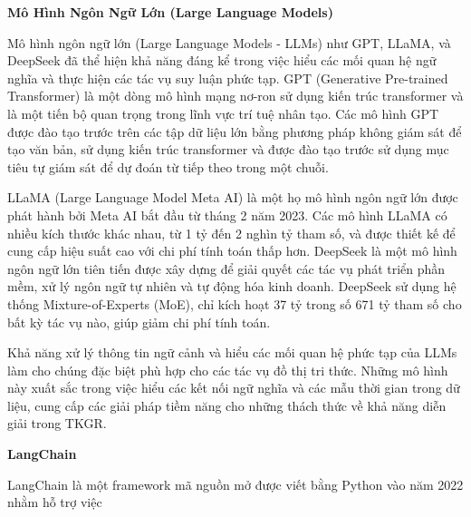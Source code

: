 \vspace{1em}
\textbf{Mô Hình Ngôn Ngữ Lớn (Large Language Models)}

Mô hình ngôn ngữ lớn (Large Language Models - LLMs) như GPT, LLaMA, và DeepSeek đã thể hiện khả năng đáng kể trong việc hiểu các mối quan hệ ngữ nghĩa và thực hiện các tác vụ suy luận phức tạp. GPT (Generative Pre-trained Transformer) là một dòng mô hình mạng nơ-ron sử dụng kiến trúc transformer và là một tiến bộ quan trọng trong lĩnh vực trí tuệ nhân tạo. Các mô hình GPT được đào tạo trước trên các tập dữ liệu lớn bằng phương pháp không giám sát để tạo văn bản, sử dụng kiến trúc transformer và được đào tạo trước sử dụng mục tiêu tự giám sát để dự đoán từ tiếp theo trong một chuỗi.

LLaMA (Large Language Model Meta AI) là một họ mô hình ngôn ngữ lớn được phát hành bởi Meta AI bắt đầu từ tháng 2 năm 2023. Các mô hình LLaMA có nhiều kích thước khác nhau, từ 1 tỷ đến 2 nghìn tỷ tham số, và được thiết kế để cung cấp hiệu suất cao với chi phí tính toán thấp hơn. DeepSeek là một mô hình ngôn ngữ lớn tiên tiến được xây dựng để giải quyết các tác vụ phát triển phần mềm, xử lý ngôn ngữ tự nhiên và tự động hóa kinh doanh. DeepSeek sử dụng hệ thống Mixture-of-Experts (MoE), chỉ kích hoạt 37 tỷ trong số 671 tỷ tham số cho bất kỳ tác vụ nào, giúp giảm chi phí tính toán.

Khả năng xử lý thông tin ngữ cảnh và hiểu các mối quan hệ phức tạp của LLMs làm cho chúng đặc biệt phù hợp cho các tác vụ đồ thị tri thức. Những mô hình này xuất sắc trong việc hiểu các kết nối ngữ nghĩa và các mẫu thời gian trong dữ liệu, cung cấp các giải pháp tiềm năng cho những thách thức về khả năng diễn giải trong TKGR.

\vspace{1em}
\textbf{LangChain}

LangChain là một framework mã nguồn mở được viết bằng Python vào năm 2022 nhằm hỗ trợ việc 






